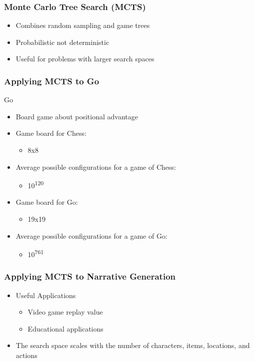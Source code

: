 \documentclass{beamer}
\begin{document}
\begin{frame}
\frametitle{Monte Carlo Tree Search (MCTS)}
\begin{itemize}
	\item Combines random sampling and game trees
	\item Probabilistic not deterministic
	\item Useful for problems with larger search spaces
\end{itemize}
\end{frame}

\begin{frame}
\frametitle{Applying MCTS to Go}
Go
\begin{itemize}
	\item Board game about positional advantage
	\item Game board for Chess:
	\begin{itemize}
		\item 8x8
	\end{itemize}
	\item Average possible configurations for a game of Chess: 
	\begin{itemize}
		\item 10\textsuperscript{120}
	\end{itemize}
	\item Game board for Go: 
	\begin{itemize}
		\item 19x19
	\end{itemize}
	\item Average possible configurations for a game of Go: 
	\begin{itemize}
		\item 10\textsuperscript{761}
	\end{itemize}
\end{itemize}
\end{frame}


\begin{frame}
\frametitle{Applying MCTS to Narrative Generation}
\begin{itemize}
	\item Useful Applications
	\begin{itemize}
		\item Video game replay value
		\item Educational applications
	\end{itemize}
	\item The search space scales with the number of characters, items, locations, and actions
\end{itemize}
\end{frame}
\end{document}
